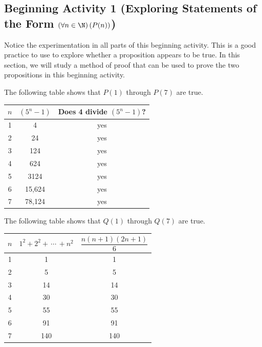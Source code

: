 \documentclass[11pt]{article}
\begin{document}
\subsection*{Beginning Activity 1 \textbf{(Exploring Statements of the Form  $\left( \forall n \in \N \right)\left( P(n) \right)$)}}
Notice the experimentation in all parts of this beginning activity.  This is a good practice to use to explore whether a proposition appears to be true.  In this section, we will study a method of proof that can be used to prove the two propositions in this beginning activity.

\eighth \noindent
The following table shows that $P(1)$ through $P(7)$ are true.
\begin{center}
\begin{tabular}[t]{| c | c | c |} \hline
$n$  &  $\left( {5^n - 1} \right)$  &  Does 4 divide $\left( {5^n - 1} \right)$? \\ \hline
1  &  4  &  yes  \\ \hline
2  &  24  &  yes \\ \hline
3  &  124  &  yes  \\ \hline
4  &  624  &  yes  \\ \hline
5  &  3124  &  yes \\ \hline
6  &  15,624  &  yes  \\ \hline
7  &  78,124  &  yes  \\ \hline
\end{tabular}
\end{center}
The following table shows that $Q(1)$ through $Q(7)$ are true.
\begin{center}
\begin{tabular}[t]{| c | c | c |} \hline
$n$  &  $1^2  + 2^2  + \, \cdots \, + n^2 $  &  $\dfrac{{n(n + 1)(2n + 1)}}{6}$ \\ \hline
1  &  1  &  1  \\ \hline
2  &  5  &  5 \\ \hline
3  &  14  &  14  \\ \hline
4  &  30  &  30  \\ \hline
5  &  55  &  55 \\ \hline
6  &  91  &  91  \\ \hline
7  &  140  &  140  \\ \hline
\end{tabular}
\end{center}
\end{document}
